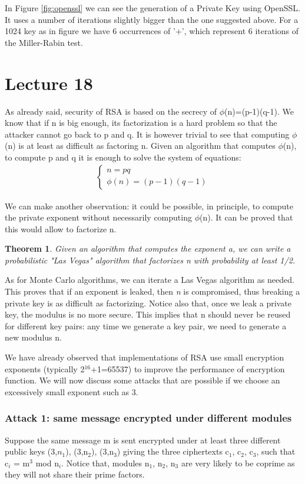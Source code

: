 \documentclass[a4paper, 12pt]{report}
\newtheorem{theorem}{\textbf{Theorem}}
\begin{document}
In Figure \ref{fig:openssl} we can see the generation of a Private Key using OpenSSL. It uses a number of iterations slightly bigger than the one suggested above. For a 1024 key as in figure we have 6 occurrences of '+', which represent 6 iterations of the Miller-Rabin test.

\chapter*{Lecture 18}
As already said, security of RSA is based on the secrecy of $\phi$(n)=(p-1)(q-1). We know that if n is big enough, its factorization is a hard problem so that the attacker cannot go back to p and q. It is however trivial to see that computing $\phi$(n) is at least as difficult as factoring n. Given an algorithm that computes $\phi$(n), to compute p and q it is enough to solve the system of equations:
\begin{align*}
\begin{cases}
	n = pq\\
	\phi(n) = (p-1)(q-1)
\end{cases}
\end{align*}

We can make another observation: it could be possible, in principle, to compute the private exponent without necessarily computing $\phi$(n). It can be proved that this would allow to factorize n.

\begin{theorem}
	Given an algorithm that computes the exponent \textit{a}, we can write a probabilistic "Las Vegas" algorithm that factorizes \textit{n} with probability at least 1/2.
\end{theorem} 

As for Monte Carlo algorithms, we can iterate a Las Vegas algorithm as needed. This proves that if an exponent is leaked, then \textit{n} is compromised, thus breaking a private key is as difficult as factorizing. Notice also that, once we leak a private key, the modulus is no more secure. This implies that n should never be reused for different key pairs: any time we generate a key pair, we need to generate a new modulus n.

We have already observed that implementations of RSA use small encryption exponents (typically 2$^{16}$+1=65537) to improve the performance of encryption function. We will now discuss some attacks that are possible if we choose an excessively small exponent such as 3.

\subsection*{Attack 1: same message encrypted under different modules}
Suppose the same message m is sent encrypted under at least three different public keys (3,$n_1$), (3,n$_2$), (3,n$_3$) giving the three ciphertexts c$_1$, c$_2$, c$_3$, such that c$_i$ = m$^3$ mod n$_i$. Notice that, modules n$_1$, n$_2$, n$_3$ are very likely to be coprime as they will not share their prime factors.
\end{document}
